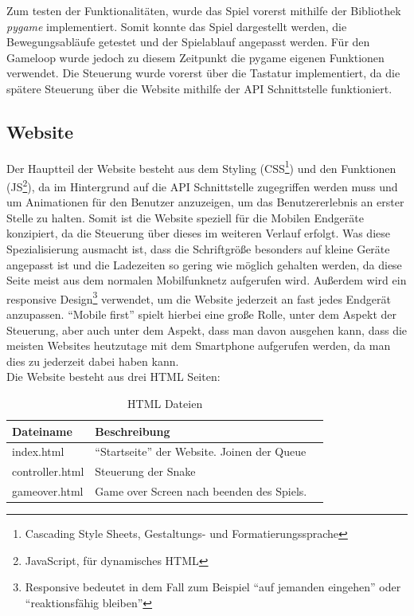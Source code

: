 \documentclass[a4paper,12pt]{scrartcl}
\begin{document}
Zum testen der Funktionalitäten, wurde das Spiel vorerst mithilfe der Bibliothek \textit{pygame} implementiert. Somit konnte das Spiel dargestellt werden, die Bewegungsabläufe getestet und der Spielablauf angepasst werden. Für den Gameloop wurde jedoch zu diesem Zeitpunkt die pygame eigenen Funktionen verwendet. Die Steuerung wurde vorerst über die Tastatur implementiert, da die spätere Steuerung über die Website mithilfe der API Schnittstelle funktioniert.

\subsection{Website}
Der Hauptteil der Website besteht aus dem Styling (CSS\footnote{Cascading Style Sheets, Gestaltungs- und Formatierungssprache}) und den Funktionen (JS\footnote{JavaScript, für dynamisches HTML}), da im Hintergrund auf die API Schnittstelle zugegriffen werden muss und um Animationen für den Benutzer anzuzeigen, um das Benutzererlebnis an erster Stelle zu halten. Somit ist die Website speziell für die Mobilen Endgeräte konzipiert, da die Steuerung über dieses im weiteren Verlauf erfolgt. Was diese Spezialisierung ausmacht ist, dass die Schriftgröße besonders auf kleine Geräte angepasst ist und die Ladezeiten so gering wie möglich gehalten werden, da diese Seite meist aus dem normalen Mobilfunknetz aufgerufen wird. Außerdem wird ein responsive Design\footnote{Responsive bedeutet in dem Fall zum Beispiel ``auf jemanden eingehen'' oder ``reaktionsfähig bleiben''} verwendet, um die Website jederzeit an fast jedes Endgerät anzupassen. ``Mobile first'' spielt hierbei eine große Rolle, unter dem Aspekt der Steuerung, aber auch unter dem Aspekt, dass man davon ausgehen kann, dass die meisten Websites heutzutage mit dem Smartphone aufgerufen werden, da man dies zu jederzeit dabei haben kann. \\
Die Website besteht aus drei HTML Seiten:

\begin{table}
\centering
\begin{tabular}[!htb]{p{4cm}|p{4cm}|p{8cm}}
Dateiname & Beschreibung \\
\hline
index.html & ``Startseite'' der Website. Joinen der Queue \\
controller.html & Steuerung der Snake \\
gameover.html & Game over Screen nach beenden des Spiels. \\
\end{tabular}
\caption{HTML Dateien}
\end{table}
\end{document}
